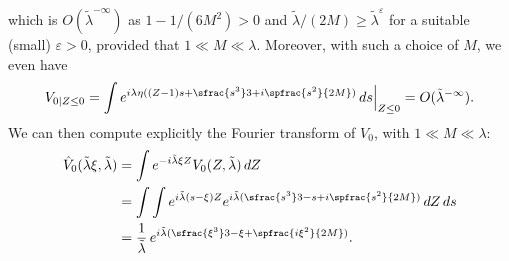 which is $O(\tilde \lambda^{-\infty})$ as $1-1/(6M^{2})>0$ and $\tilde \lambda /(2M) \geq \tilde \lambda^{\varepsilon}$ for a suitable (small) $\varepsilon>0$, provided that $1\ll M\ll \lambda$. Moreover, with such a choice of $M$, we even have
\begin{equation}
\label{eq:Zneg}
V_{0|{Z}\leq 0}=\int e^{i\lambda \eta(({Z}-1) s+\sfrac {s^{3}} 3 +i \spfrac {s^{2}}{2M})} \,ds\Big|_{{Z}\leq 0}=O(\tilde \lambda^{-\infty}).
\end{equation}
We can then compute explicitly the Fourier transform of $V_0$, with $1\ll M\ll \lambda $:
\begin{equation}
\label{eq:55}
\begin{split}
\hat V_{0} (\tilde\lambda \xi,\tilde\lambda) & = \int e^{-i\tilde\lambda \xi {Z} }V_0({Z},\tilde\lambda)\,dZ \\
& =\int \int e^{i\tilde\lambda (s-\xi){Z}} e^{i\tilde\lambda (\sfrac {s^{3}} 3 -s +i \spfrac {s^{2}}{2M})} \,dZ \,ds \\
& =\frac 1 {\tilde\lambda}\, e^{i\tilde\lambda (\sfrac{\xi^{3}}3-\xi+\spfrac {i \xi^{2}}{2M})}.
\end{split}
\end{equation}
